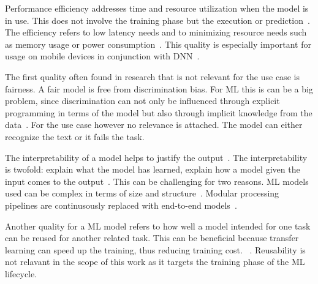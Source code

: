 Performance efficiency addresses time and resource utilization when the model is in use.
This does not involve the training phase but the execution or
prediction~\citep{siebert_construction_2021}.
The efficiency refers to low latency needs and to minimizing resource needs such as memory
usage or power consumption~\citep{nakamichi_requirements-driven_2020, siebert_construction_2021,
sourvanos_challenges_2018}.
This quality is especially important for usage on mobile devices in conjunction with
\ac{DNN}~\citep{sourvanos_challenges_2018, niu_26ms_2019}.

The first quality often found in research that is not relevant for the use case is fairness.
A fair model is free from discrimination bias.
For \ac{ML} this is can be a big problem, since discrimination can not only be influenced through
explicit programming in terms of the model but also through implicit knowledge from the
data~\citep{vogelsang_requirements_2019}.
For the use case however no relevance is attached.
The model can either recognize the text or it fails the task.

The interpretability of a model helps to justify the output~\citep{ashmore_assuring_2021}.
The interpretability is twofold: explain what the model has learned, explain how a model given the
input comes to the output~\citep{vogelsang_requirements_2019}.
This can be challenging for two reasons.
\ac{ML} models used can be complex in terms of size and structure~\citep{ashmore_assuring_2021}.
Modular processing pipelines are continusously replaced with end-to-end
models~\cite{arpteg_software_2018}.

Another quality for a \ac{ML} model refers to how well a model intended for one task can be reused
for another related task.
This can be beneficial because transfer learning can speed up the training, thus reducing training
cost.
~\citep{ashmore_assuring_2021}.
Reusability is not relavant in the scope of this work as it targets the training phase of the
\ac{ML} lifecycle.
